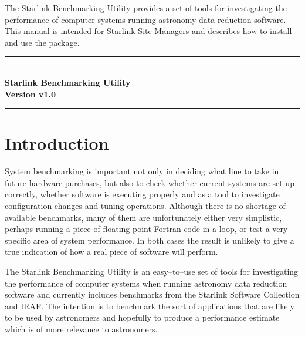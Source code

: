 \documentclass[11pt]{article}
\newcommand{\stardocinitials}  {SSN}
\newcommand{\stardocnumber}    {23.3}
\newcommand{\stardoctitle}     {Starlink Benchmarking Utility}
\newcommand{\stardocabstract}  {The Starlink Benchmarking Utility provides a
set of tools for investigating the performance of computer systems running
astronomy data reduction software. This manual is intended for Starlink Site Managers and describes how to install and use the package.}
\newcommand{\stardocversion}   {Version \pkgver}
\newcommand{\stardocname}{\stardocinitials /\stardocnumber}
\newenvironment{latexonly}{}{}
\renewcommand{\thepage}{\roman{page}}
\newcommand{\pkgver}     {v1.0}
\renewcommand{\thepage}{\roman{page}}
\begin{document}
\stardocabstract
\newpage
\begin{latexonly}
  \begin {center}
    \rule{80mm}{0.5mm} \\ [1ex]
    {\Large\bf \stardoctitle \\ [2.5ex]
            \stardocversion} \\ [2ex]
     \rule{80mm}{0.5mm}
  \end{center}
  \vspace{20mm}
  \setlength{\parskip}{0mm}
  \tableofcontents
  \setlength{\parskip}{\medskipamount}
  \markright{\stardocname}
\end{latexonly}
\newpage
\renewcommand{\thepage}{\arabic{page}}
\setcounter{page}{1}


\newpage
\renewcommand{\thepage}{\arabic{page}}
\setcounter{page}{1}
\vspace{30mm}
\section{Introduction}

System benchmarking is important not only in deciding what line to take
in future hardware purchases, but also to check whether current systems are
set up correctly, whether software is executing properly and as a tool to
investigate configuration changes and tuning operations. Although there is
no shortage of available benchmarks, many of them are unfortunately either 
very simplistic, perhaps running a piece of floating point Fortran code in a loop, or test a very specific area of system performance. In both cases the
result is unlikely to give a true indication of how a real piece of software
will perform.

The Starlink Benchmarking Utility is an easy--to--use set of
tools for investigating the performance of computer systems when
running astronomy data reduction software and currently includes
benchmarks from the Starlink Software Collection and IRAF. The
intention is to benchmark the sort of applications that are likely to
be used by astronomers and hopefully to produce a performance estimate
which is of more relevance to astronomers.
\end{document}
